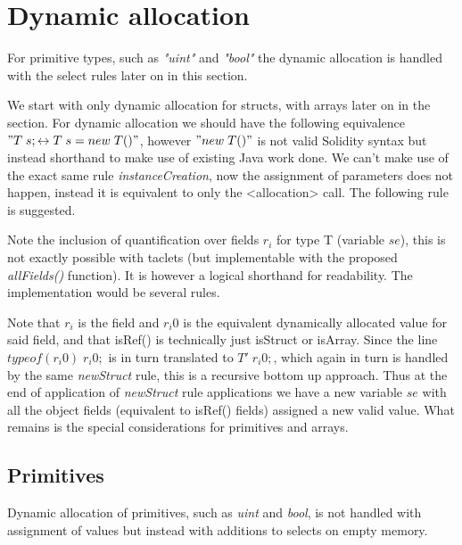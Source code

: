 \documentclass{article}
\begin{document}
	\section{Dynamic allocation} \label{dynamic}
	For primitive types, such as \textit{"uint"} and \textit{"bool"} the dynamic allocation is handled with the select rules later on in this section. 
	
	We start with only dynamic allocation for structs, with arrays later on in the section. For dynamic allocation we should have the following equivalence $"T\; s; \leftrightarrow T\;  s = new\;  T()"$, however $"new\;  T()"$ is not valid Solidity syntax but instead shorthand to make use of existing Java work done. We can't make use of the exact same rule \textit{instanceCreation}, now the assignment of parameters does not happen, instead it is equivalent to only the <allocation> call. The following rule is suggested. 
	
	Note the inclusion of quantification over fields $r_i$ for type T (variable $se$), this is not exactly possible with taclets (but implementable with the proposed \textit{allFields()} function). It is however a logical shorthand for readability. The implementation would be several rules. 
	\begin{prooftree}
	\end{prooftree}

	Note that $r_i$ is the field and $r_i0$ is the equivalent dynamically allocated value for said field, and that isRef() is technically just isStruct or isArray. Since the line $typeof(r_i0)\; r_i0;$ is in turn translated to $T' \; r_i0;$, which again in turn is handled by the same \textit{newStruct} rule,  this is a recursive bottom up approach. Thus at the end of application of \textit{newStruct} rule applications we have a new variable $se$ with all the object fields (equivalent to isRef() fields) assigned a new valid value. What remains is the special considerations for primitives and arrays. 
	
	\subsection{Primitives}
	Dynamic allocation of primitives, such as \textit{uint} and \textit{bool}, is not handled with assignment of values but instead with additions to selects on empty memory. 
	
\end{document}
